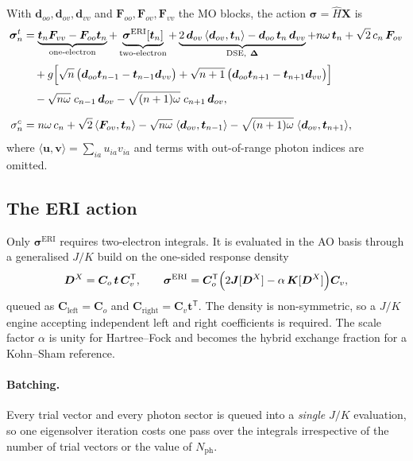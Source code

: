\documentclass[11pt]{article}
\newcommand{\nph}{N_{\mathrm{ph}}}
\begin{document}
With $\bm{d}_{oo}, \bm{d}_{ov}, \bm{d}_{vv}$ and
$\bm{F}_{oo}, \bm{F}_{ov}, \bm{F}_{vv}$ the MO blocks, the action
$\bm{\sigma} = \hat{H}\bm{X}$ is
\begin{align}
\bm{\sigma}^{t}_{n}
&= \underbrace{\bm{t}_n \bm{F}_{vv} - \bm{F}_{oo}\bm{t}_n}_{\text{one-electron}}
 + \underbrace{\bm{\sigma}^{\mathrm{ERI}}[\bm{t}_n]}_{\text{two-electron}}
 + \underbrace{2\,\bm{d}_{ov}\,\langle \bm{d}_{ov}, \bm{t}_n\rangle
   - \bm{d}_{oo}\,\bm{t}_n\,\bm{d}_{vv}}_{\text{DSE},\ \bm{\Delta}}
 + n\omega\,\bm{t}_n
 + \sqrt{2}\,c_n\,\bm{F}_{ov}
 \nonumber\\[2pt]
&\quad
 + g\Bigl[\sqrt{n}\,\bigl(\bm{d}_{oo}\bm{t}_{n-1} - \bm{t}_{n-1}\bm{d}_{vv}\bigr)
        + \sqrt{n+1}\,\bigl(\bm{d}_{oo}\bm{t}_{n+1} - \bm{t}_{n+1}\bm{d}_{vv}\bigr)\Bigr]
 \nonumber\\[2pt]
&\quad
 - \sqrt{n\omega}\;c_{n-1}\,\bm{d}_{ov}
 - \sqrt{(n+1)\omega}\;c_{n+1}\,\bm{d}_{ov},
\label{eq:sigma_t}
\\[6pt]
\sigma^{c}_{n}
&= n\omega\,c_n
 + \sqrt{2}\,\langle \bm{F}_{ov}, \bm{t}_n\rangle
 - \sqrt{n\omega}\;\langle \bm{d}_{ov}, \bm{t}_{n-1}\rangle
 - \sqrt{(n+1)\omega}\;\langle \bm{d}_{ov}, \bm{t}_{n+1}\rangle,
\label{eq:sigma_c}
\end{align}
where $\langle \bm{u}, \bm{v}\rangle = \sum_{ia} u_{ia} v_{ia}$ and terms with
out-of-range photon indices are omitted.

\subsection{The ERI action}

Only $\bm{\sigma}^{\mathrm{ERI}}$ requires two-electron integrals. It is
evaluated in the AO basis through a generalised $J/K$ build on the one-sided
response density
\begin{equation}
\bm{D}^X = \bm{C}_o\,\bm{t}\,\bm{C}_v^{\mathsf{T}},
\qquad
\bm{\sigma}^{\mathrm{ERI}}
 = \bm{C}_o^{\mathsf{T}}\Bigl(2\bm{J}[\bm{D}^X] - \alpha\,\bm{K}[\bm{D}^X]\Bigr)\bm{C}_v,
\label{eq:erisigma}
\end{equation}
queued as $\bm{C}_{\mathrm{left}} = \bm{C}_o$ and
$\bm{C}_{\mathrm{right}} = \bm{C}_v \bm{t}^{\mathsf{T}}$. The density is
non-symmetric, so a $J/K$ engine accepting independent left and right
coefficients is required. The scale factor $\alpha$ is unity for Hartree--Fock
and becomes the hybrid exchange fraction for a Kohn--Sham reference.

\paragraph{Batching.} Every trial vector and every photon sector is queued into
a \emph{single} $J/K$ evaluation, so one eigensolver iteration costs one pass
over the integrals irrespective of the number of trial vectors or the value of
$\nph$.
\end{document}
